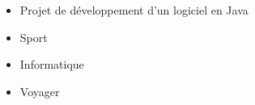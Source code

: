 \documentclass[10pt,a4paper,ragged2e]{altacv}
\begin{document}



\divider
{}
\begin{itemize}
	\item Projet de développement d'un logiciel en Java
\end{itemize}

\medskip

\begin{itemize}
	\item Sport\\%
\divider
	\item Informatique \\
\divider
	\item Voyager \\
\end{itemize}









\end{document}
